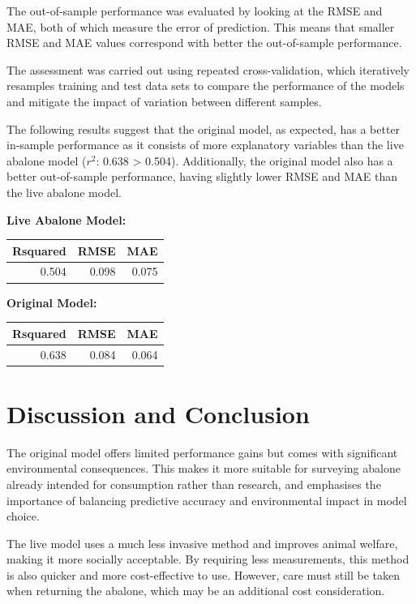 \documentclass[a4paper,9pt,twocolumn,twoside,]{pinp}
\begin{document}
The out-of-sample performance was evaluated by looking at the RMSE and
MAE, both of which measure the error of prediction. This means that
smaller RMSE and MAE values correspond with better the out-of-sample
performance.

The assessment was carried out using repeated cross-validation, which
iteratively resamples training and test data sets to compare the
performance of the models and mitigate the impact of variation between
different samples.

The following results suggest that the original model, as expected, has
a better in-sample performance as it consists of more explanatory
variables than the live abalone model (\(r^2\): 0.638 \textgreater{}
0.504). Additionally, the original model also has a better out-of-sample
performance, having slightly lower RMSE and MAE than the live abalone
model.

\hfill\break
\textbf{Live Abalone Model: }\\

\begin{tabular}{r|r|r}
\hline
Rsquared & RMSE & MAE\\
\hline
0.504 & 0.098 & 0.075\\
\hline
\end{tabular}

\hfill\break
\textbf{Original Model: }\\

\begin{tabular}{r|r|r}
\hline
Rsquared & RMSE & MAE\\
\hline
0.638 & 0.084 & 0.064\\
\hline
\end{tabular}

\hypertarget{discussion-and-conclusion}{%
\section{Discussion and Conclusion}\label{discussion-and-conclusion}}

The original model offers limited performance gains but comes with
significant environmental consequences. This makes it more suitable for
surveying abalone already intended for consumption rather than research,
and emphasises the importance of balancing predictive accuracy and
environmental impact in model choice.

The live model uses a much less invasive method and improves animal
welfare, making it more socially acceptable. By requiring less
measurements, this method is also quicker and more cost-effective to
use. However, care must still be taken when returning the abalone, which
may be an additional cost consideration.
\end{document}
